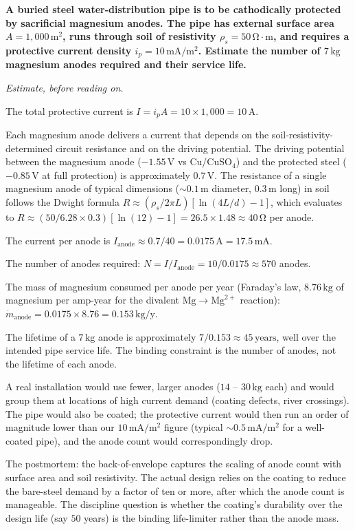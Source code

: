 \begin{estimation}
\textbf{A buried steel water-distribution pipe is to be cathodically
protected by sacrificial magnesium anodes. The pipe has external
surface area $A = 1{,}000\,\text{m}^2$, runs through soil of
resistivity $\rho_s = 50\,\si{\ohm}\cdot\text{m}$, and requires a
protective current density $i_p = 10\,\text{mA}/\text{m}^2$. Estimate
the number of $7\,\text{kg}$ magnesium anodes required and their
service life.}

\smallskip
\textit{Estimate, before reading on.}

\smallskip
The total protective current is $I = i_p A = 10 \times 1{,}000 =
10\,\text{A}$.

Each magnesium anode delivers a current that depends on the
soil-resistivity-determined circuit resistance and on the
driving potential. The driving potential between the magnesium anode
($-1.55\,\text{V}$ vs Cu/CuSO$_4$) and the protected steel
($-0.85\,\text{V}$ at full protection) is approximately $0.7\,\text{V}$.
The resistance of a single magnesium anode of typical dimensions
($\sim 0.1\,\text{m}$ diameter, $0.3\,\text{m}$ long) in soil follows
the Dwight formula
$R \approx (\rho_s/2\pi L) [\ln(4L/d) - 1]$, which evaluates to
$R \approx (50 / 6.28 \times 0.3) [\ln(12) - 1] = 26.5 \times 1.48
\approx 40\,\si{\ohm}$ per anode.

The current per anode is $I_{\text{anode}} \approx 0.7 / 40 =
0.0175\,\text{A} = 17.5\,\text{mA}$.

The number of anodes required: $N = I / I_{\text{anode}} = 10 /
0.0175 \approx 570$ anodes.

The mass of magnesium consumed per anode per year (Faraday's law,
$8.76\,\text{kg}$ of magnesium per amp-year for the divalent
$\text{Mg} \to \text{Mg}^{2+}$ reaction):
$\dot{m}_{\text{anode}} = 0.0175 \times 8.76 = 0.153\,\text{kg/y}$.

The lifetime of a $7\,\text{kg}$ anode is approximately $7/0.153
\approx 45\,\text{years}$, well over the intended pipe service life.
The binding constraint is the number of anodes, not the lifetime of
each anode.

A real installation would use fewer, larger anodes ($14$ -- $30\,\text{kg}$
each) and would group them at locations of high current demand
(coating defects, river crossings). The pipe would also be coated;
the protective current would then run an order of magnitude lower than
our $10\,\text{mA}/\text{m}^2$ figure (typical $\sim 0.5\,\text{mA}/
\text{m}^2$ for a well-coated pipe), and the anode count would
correspondingly drop.

The postmortem: the back-of-envelope captures the scaling of anode
count with surface area and soil resistivity. The actual design relies
on the coating to reduce the bare-steel demand by a factor of ten
or more, after which the anode count is manageable. The discipline
question is whether the coating's durability over the design life
(say $50$ years) is the binding life-limiter rather than the anode
mass.
\end{estimation}

